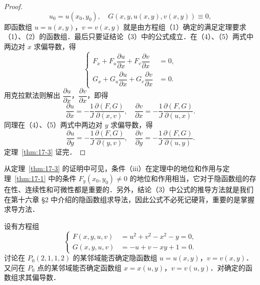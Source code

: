 \begin{proof}
\begin{equation}
u_{0}=u(x_{0},y_{0}),\quad G(x,y,u(x,y),v(x,y))\equiv0,
\tag{5}
\end{equation}
即函数组 $u=u(x,y)$，$v=v(x,y)$ 就是由方程组（1）确定的满足定理要求（1）、（2）的函数组．最后只要证结论（3）中的公式成立．在（4）、（5）两式中两边对 $x$ 求偏导数，得
\[
\left\{\begin{aligned}
F_{x}+F_{u}\dfrac{\partial u}{\partial x}+F_{v}\dfrac{\partial v}{\partial x}&=0,\\[6pt]
G_{x}+G_{u}\dfrac{\partial u}{\partial x}+G_{v}\dfrac{\partial v}{\partial x}&=0.
\end{aligned}\right.
\]
用克拉默法则解出 $\dfrac{\partial u}{\partial x}$，$\dfrac{\partial v}{\partial x}$，即得
\[
\frac{\partial u}{\partial x}=-\frac{1}{J}\frac{\partial(F,G)}{\partial(x,v)},\quad \frac{\partial v}{\partial x}=-\frac{1}{J}\frac{\partial(F,G)}{\partial(u,x)}.
\]
同理在（4）、（5）两式中两边对 $y$ 求偏导数，得
\[
\frac{\partial u}{\partial y}=-\frac{1}{J}\frac{\partial(F,G)}{\partial(y,v)},\quad \frac{\partial v}{\partial y}=-\frac{1}{J}\frac{\partial(F,G)}{\partial(u,y)}.
\]
定理~\ref{thm:17-3} 证完．
\end{proof}

从定理~\ref{thm:17-3} 的证明中可见，条件（iii）在定理中的地位和作用与定理~\ref{thm:17-1} 中的条件 $F_{y}(x_{0},y_{0})\neq0$ 的地位和作用相当，它对于隐函数组的存在性、连续性和可微性都是重要的．另外，结论（3）中公式的推导方法就是我们在第十六章 §2 中介绍的隐函数组求导法，因此公式不必死记硬背，重要的是掌握求导方法．

\begin{example}\label{ex:17-2-1}
设有方程组
\[
\left\{\begin{aligned}
F(x,y,u,v)&=u^{2}+v^{2}-x^{2}-y=0,\\
G(x,y,u,v)&=-u+v-xy+1=0.
\end{aligned}\right.
\]
讨论在 $P_{0}(2,1,1,2)$ 的某邻域能否确定隐函数组 $u=u(x,y)$，$v=v(x,y)$．又问在 $P_{0}$ 点的某邻域能否确定函数组 $x=x(u,y)$，$v=v(u,y)$．对确定的函数组求其偏导数．
\end{example}

